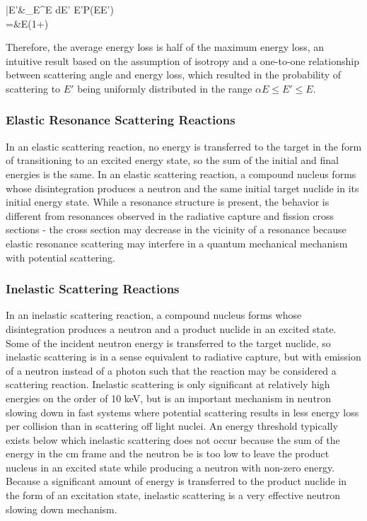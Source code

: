 \beqa
\bar{E'}\equiv&\int_{\alpha E}^E dE' E'P(E\rightarrow E')\\
=&E(1+\alpha)
\eeqa

Therefore, the average energy loss is half of the maximum energy loss, an intuitive result based on the assumption of isotropy and a one-to-one relationship between scattering angle and energy loss, which resulted in the probability of scattering to \(E'\) being uniformly distributed in the range \(\alpha E\leq E'\leq E\).

\subsubsection{Elastic Resonance Scattering Reactions}

In an elastic scattering reaction, no energy is transferred to the target in the form of transitioning to an excited energy state, so the sum of the initial and final energies is the same. In an elastic scattering reaction, a compound nucleus forms whose disintegration produces a neutron and the same initial target nuclide in its initial energy state. While a resonance structure is present, the behavior is different from resonances observed in the radiative capture and fission cross sections - the cross section may decrease in the vicinity of a resonance because elastic resonance scattering may interfere in a quantum mechanical mechanism with potential scattering.

\subsubsection{Inelastic Scattering Reactions}

In an inelastic scattering reaction, a compound nucleus forms whose disintegration produces a neutron and a product nuclide in an excited state. Some of the incident neutron energy is transferred to the target nuclide, so inelastic scattering is in a sense equivalent to radiative capture, but with emission of a neutron instead of a photon such that the reaction may be considered a scattering reaction. Inelastic scattering is only significant at relatively high energies on the order of 10 keV, but is an important mechanism in neutron slowing down in fast systems where potential scattering results in less energy loss per collision than in scattering off light nuclei. An energy threshold typically exists below which inelastic scattering does not occur because the sum of the energy in the \gls{cm} frame and the neutron \gls{be} is too low to leave the product nucleus in an excited state while producing a neutron with non-zero energy. Because a significant amount of energy is transferred to the product nuclide in the form of an excitation state, inelastic scattering is a very effective neutron slowing down mechanism.

